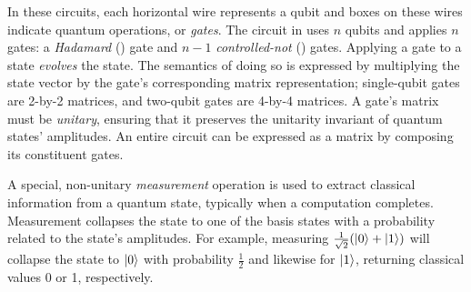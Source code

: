 In these circuits, each horizontal wire represents a qubit and boxes on these wires indicate quantum operations, or \emph{gates}. The circuit in  uses $n$ qubits and applies $n$ gates: a \emph{Hadamard} () gate and $n-1$ \emph{controlled-not} () gates.
Applying a gate to a state \emph{evolves} the state. The semantics of doing so is expressed by multiplying the state vector by the gate's corresponding matrix representation; single-qubit gates are 2-by-2 matrices, and two-qubit gates are 4-by-4 matrices. A gate's matrix must be \emph{unitary}, ensuring that it preserves the unitarity invariant of quantum states' amplitudes. An entire circuit can be expressed as a matrix by composing its constituent gates.

 A special, non-unitary \emph{measurement} operation is used to extract classical information from a quantum state, typically when a computation completes. Measurement collapses the state to one of the basis states with a probability related to the state's amplitudes. For example, measuring $\frac{1}{\sqrt{2}}(\left\vert{0}\right\rangle + \left\vert{1}\right\rangle)$ will collapse the state to $\left\vert{0}\right\rangle$ with probability $\frac{1}{2}$ and likewise for $\left\vert{1}\right\rangle$, returning classical values 0 or 1, respectively.

